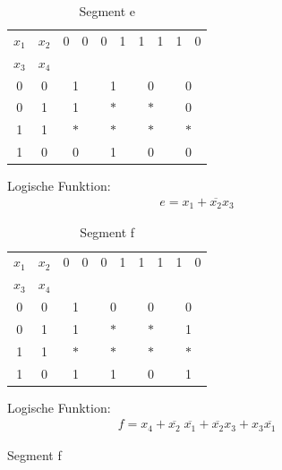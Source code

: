 \documentclass[numbers=noenddot,12pt,a4paper]{scrartcl}
\newcommand{\nicht}[1]{\overline{#1}}
\begin{document}
\begin{figure}[H]
\begin{minipage}[htbp]{0.49\textwidth}
\begin{table}[H]
\centering
\begin{tabular}{cc||cc|cc|cc|cc}
$x_1$ & $x_2$ & 0 & 0 & 0 & 1 & 1 & 1 & 1 & 0 \\ \cline{0-1} 
$x_3$ & $x_4$ & & & & & & & & \\ \cline{1-10}
0 & 0 & \multicolumn{2}{|c|}{1} & \multicolumn{2}{|c|}{1} & \multicolumn{2}{|c|}{0} & \multicolumn{2}{|c}{0} \\
0 & 1 & \multicolumn{2}{|c|}{1} & \multicolumn{2}{|c|}{$\ast$} & \multicolumn{2}{|c|}{$\ast$} & \multicolumn{2}{|c}{0} \\ 
1 & 1 & \multicolumn{2}{|c|}{$\ast$} & \multicolumn{2}{|c|}{$\ast$} & \multicolumn{2}{|c|}{$\ast$} & \multicolumn{2}{|c}{$\ast$} \\ 
1 & 0 & \multicolumn{2}{|c|}{0} & \multicolumn{2}{|c|}{1} & \multicolumn{2}{|c|}{0} & \multicolumn{2}{|c}{0} \\ 
\end{tabular}
\caption{Segment e}
\end{table}
Logische Funktion:
\begin{align}
e=x_1+\nicht{x_2} x_3
\end{align}
\end{minipage}
\hfill
\begin{minipage}[htbp]{0.49\textwidth}
\begin{table}[H]
\centering
\begin{tabular}{cc||cc|cc|cc|cc}
$x_1$ & $x_2$ & 0 & 0 & 0 & 1 & 1 & 1 & 1 & 0 \\ \cline{0-1} 
$x_3$ & $x_4$ & & & & & & & & \\ \cline{1-10}
0 & 0 & \multicolumn{2}{|c|}{1} & \multicolumn{2}{|c|}{0} & \multicolumn{2}{|c|}{0} & \multicolumn{2}{|c}{0} \\
0 & 1 & \multicolumn{2}{|c|}{1} & \multicolumn{2}{|c|}{$\ast$} & \multicolumn{2}{|c|}{$\ast$} & \multicolumn{2}{|c}{1} \\ 
1 & 1 & \multicolumn{2}{|c|}{$\ast$} & \multicolumn{2}{|c|}{$\ast$} & \multicolumn{2}{|c|}{$\ast$} & \multicolumn{2}{|c}{$\ast$} \\ 
1 & 0 & \multicolumn{2}{|c|}{1} & \multicolumn{2}{|c|}{1} & \multicolumn{2}{|c|}{0} & \multicolumn{2}{|c}{1} \\ 
\end{tabular}
\caption{Segment f}
\end{table}
Logische Funktion:
\begin{align}
f=x_4 + \nicht{x_2} \; \nicht{x_1} + \nicht{x_2}x_3 + x_3 \nicht{x_1}
\end{align}
\end{minipage}
\end{figure}
\end{document}

